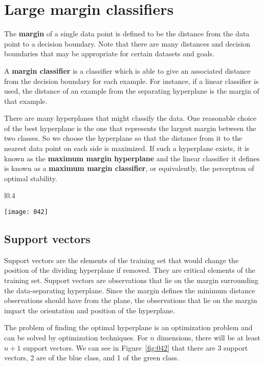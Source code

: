 \section{Large margin classifiers}
The \textbf{margin} of a single data point is defined to be the distance from the data point to a decision boundary. Note that there are many distances and decision boundaries that may be appropriate for certain datasets and goals.

A \textbf{margin classifier} is a classifier which is able to give an associated distance from the decision boundary for each example. For instance, if a linear classifier is used, the distance of an example from the separating hyperplane is the margin of that example.

There are many hyperplanes that might classify the data. One reasonable choice of the best hyperplane is the one that represents the largest margin between the two classes. So we choose the hyperplane so that the distance from it to the nearest data point on each side is maximized. If such a hyperplane exists, it is known as the \textbf{maximum margin hyperplane} and the linear classifier it defines is known as a \textbf{maximum margin classifier}, or equivalently, the perceptron of optimal stability.
\begin{wrapfigure}{l}{0.4\textwidth}
    \begin{center}
        \texttt{[image: 042]}
        \caption{Maximum-margin hyperplane and margins for an SVM trained with samples from two classes.}
        \label{fig:042}
    \end{center}
    \vspace*{-40pt}
\end{wrapfigure}
\subsection{Support vectors}
Support vectors are the elements of the training set that would change the position of the dividing hyperplane if removed. They are critical elements of the training set. Support vectors are observations that lie on the margin surrounding the data-separating hyperplane. Since the margin defines the minimum distance observations should have from the plane, the observations that lie on the margin impact the orientation and position of the hyperplane.

The problem of finding the optimal hyperplane is an optimization problem and can be solved by optimization techniques. For \(n\) dimensions, there will be at least \(n+1\) support vectors. We can see in Figure~\ref{fig:042} that there are 3 support vectors, 2 are of the blue class, and 1 of the green class.


